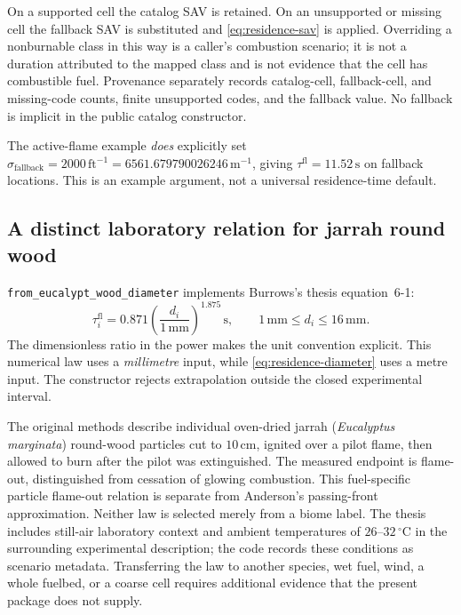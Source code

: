 \documentclass[11pt,a4paper]{article}
\begin{document}
On a supported cell the catalog SAV is retained. On an unsupported or missing
cell the fallback SAV is substituted and \eqref{eq:residence-sav} is applied.
Overriding a nonburnable class in this way is a caller's combustion scenario;
it is not a duration attributed to the mapped class and is not evidence that
the cell has combustible fuel. Provenance separately records catalog-cell,
fallback-cell, and missing-code counts, finite unsupported codes, and the
fallback value. No fallback is implicit in the public catalog constructor.

The active-flame example \emph{does} explicitly set
$\sigma_{\mathrm{fallback}}=2000\,\mathrm{ft^{-1}}
=6561.679790026246\,\mathrm{m^{-1}}$, giving $\tau^{\mathrm{fl}}=11.52\,\mathrm{s}$ on fallback
locations. This is an example argument, not a universal residence-time default.

\subsection{A distinct laboratory relation for jarrah round wood}

\texttt{from\_eucalypt\_wood\_diameter} implements Burrows's thesis equation~6-1:
\begin{equation}
 \tau_i^{\mathrm{fl}}=0.871\left(\frac{d_i}{1\,\mathrm{mm}}\right)^{1.875}\,\mathrm{s},
 \qquad 1\,\mathrm{mm}\leq d_i\leq16\,\mathrm{mm}.
 \label{eq:burrows-residence}
\end{equation}
The dimensionless ratio in the power makes the unit convention explicit.
This numerical law uses a \emph{millimetre} input, while
\eqref{eq:residence-diameter} uses a metre input. The constructor rejects
extrapolation outside the closed experimental interval.

The original methods describe individual oven-dried jarrah
(\emph{Eucalyptus marginata}) round-wood particles cut to $10\,\mathrm{cm}$,
ignited over a pilot flame, then allowed to burn after the pilot was
extinguished. The measured endpoint is flame-out, distinguished from
cessation of glowing combustion.\cite{burrows1994}
This fuel-specific particle flame-out relation is separate from Anderson's
passing-front approximation. Neither law is selected merely from a biome label.
The thesis includes still-air laboratory context and ambient temperatures of
$26$--$32\,^{\circ}\mathrm C$ in the surrounding experimental description;
the code records these conditions as scenario metadata. Transferring the law
to another species, wet fuel, wind, a whole fuelbed, or a coarse cell requires
additional evidence that the present package does not supply.
\end{document}
